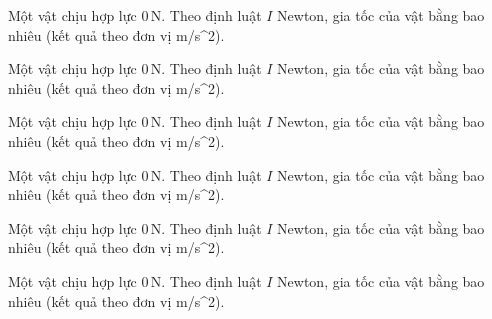 \begin{ex}
Một vật chịu hợp lực $0\,\text{N}$. Theo định luật $I$ Newton, gia tốc của vật bằng bao nhiêu (kết quả theo đơn vị m/s^2).
\end{ex}

\begin{ex}
Một vật chịu hợp lực $0\,\text{N}$. Theo định luật $I$ Newton, gia tốc của vật bằng bao nhiêu (kết quả theo đơn vị m/s^2).
\end{ex}

\begin{bt}
Một vật chịu hợp lực $0\,\text{N}$. Theo định luật $I$ Newton, gia tốc của vật bằng bao nhiêu (kết quả theo đơn vị m/s^2).
\end{bt}

\begin{bt}
Một vật chịu hợp lực $0\,\text{N}$. Theo định luật $I$ Newton, gia tốc của vật bằng bao nhiêu (kết quả theo đơn vị m/s^2).
\end{bt}

\begin{bt}
Một vật chịu hợp lực $0\,\text{N}$. Theo định luật $I$ Newton, gia tốc của vật bằng bao nhiêu (kết quả theo đơn vị m/s^2).
\end{bt}

\begin{bt}
Một vật chịu hợp lực $0\,\text{N}$. Theo định luật $I$ Newton, gia tốc của vật bằng bao nhiêu (kết quả theo đơn vị m/s^2).
\end{bt}

